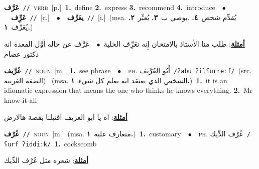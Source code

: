 \documentclass[10pt,a4paper,twoside]{article} %
\begin{document}
\begin{multicols}{2}
{\setlength\topsep{0pt}\textbf{\foreignlanguage{arabic}{عَرَّف}}\ {\color{gray}\texttt{//}\color{black}}\ \textsc{verb}\ [p.]\ \textbf{1.}~define  \textbf{2.}~express  \textbf{3.}~recommend  \textbf{4.}~introduce\ \ $\bullet$\ \ \setlength\topsep{0pt}\textbf{\foreignlanguage{arabic}{عَرِِّف}}\ {\color{gray}\texttt{//}\color{black}}\ [c.]\ \ $\bullet$\ \ \setlength\topsep{0pt}\textbf{\foreignlanguage{arabic}{يعَرِّف}}\ {\color{gray}\texttt{//}\color{black}}\ [i.]\ \color{gray}(msa. \foreignlanguage{arabic}{يُقدِّم شخص}~\foreignlanguage{arabic}{\textbf{٤.}}  .\foreignlanguage{arabic}{يوصي ب}~\foreignlanguage{arabic}{\textbf{٣.}}  \foreignlanguage{arabic}{يُعبِّر}~\foreignlanguage{arabic}{\textbf{٢.}}  \foreignlanguage{arabic}{يُعَرِّف}~\foreignlanguage{arabic}{\textbf{١.}})\color{black}\  \begin{flushright}\color{gray}\foreignlanguage{arabic}{\textbf{\underline{\foreignlanguage{arabic}{أمثلة}}}: طلب منا الأستاذ بالامتحان إِنه نعَرِِّف الخلية\ $\bullet$\ \  عَرَّف عن حاله أوَّل القعدة انه دكتور عصام}\end{flushright}\color{black}} \vspace{2mm}

{\setlength\topsep{0pt}\textbf{\foreignlanguage{arabic}{عُرَّيف}}\ {\color{gray}\texttt{//}\color{black}}\ \textsc{noun}\ [m.]\ \textbf{1.}~see phrase\ \ $\bullet$\ \ \textsc{ph.} \color{gray} \foreignlanguage{arabic}{أَبُو العُرَّيف}\color{black}\ {\color{gray}\texttt{/{\sffamily ʔabu ʔilʕurreːf}/}\color{black}}\ \color{gray}(src. \foreignlanguage{arabic}{الضفة الغربية})\color{black}\ \color{gray} (msa. \foreignlanguage{arabic}{الشخص الذي يعتقد انه يعلم كل شيء}~\foreignlanguage{arabic}{\textbf{١.}})\color{black}\ \textbf{1.}~it is an idiomatic expression that means the one who thinks he knows everything.  \textbf{2.}~Mr-know-it-all\  \begin{flushright}\color{gray}\foreignlanguage{arabic}{\textbf{\underline{\foreignlanguage{arabic}{أمثلة}}}: اه يا ابو العريف افتيلنا بقصة هالارض}\end{flushright}\color{black}} \vspace{2mm}

{\setlength\topsep{0pt}\textbf{\foreignlanguage{arabic}{عُرْف}}\ {\color{gray}\texttt{//}\color{black}}\ \textsc{noun}\ [m.]\ \color{gray}(msa. \foreignlanguage{arabic}{متعارف عليه}~\foreignlanguage{arabic}{\textbf{١.}})\color{black}\ \textbf{1.}~customary\ \ $\bullet$\ \ \textsc{ph.} \color{gray} \foreignlanguage{arabic}{عُرْف الدِّيك}\color{black}\ {\color{gray}\texttt{/{\sffamily ʕurf ʔiddiːk}/}\color{black}}\ \textbf{1.}~cockscomb\  \begin{flushright}\color{gray}\foreignlanguage{arabic}{\textbf{\underline{\foreignlanguage{arabic}{أمثلة}}}: شعره مثل عُرْف الدِّيك}\end{flushright}\color{black}} \vspace{2mm}


\end{multicols}
\end{document}
